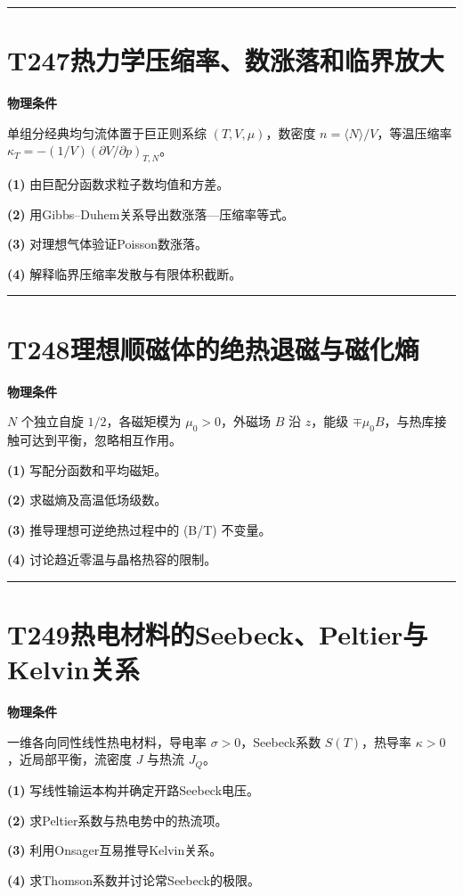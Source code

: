 \documentclass[UTF8,a4paper,11pt,oneside,openany]{ctexbook}
\begin{document}
\par\bigskip\hrule\bigskip
\section*{T247\quad 热力学压缩率、数涨落和临界放大}
\textbf{物理条件}\par 单组分经典均匀流体置于巨正则系综 \((T,V,\mu)\)，数密度 \(n=\langle N\rangle/V\)，等温压缩率 \(\kappa_T=-(1/V)(\partial V/\partial p)_{T,N}\)。
\par\noindent\textbf{(1)} 由巨配分函数求粒子数均值和方差。
\par\noindent\textbf{(2)} 用Gibbs–Duhem关系导出数涨落—压缩率等式。
\par\noindent\textbf{(3)} 对理想气体验证Poisson数涨落。
\par\noindent\textbf{(4)} 解释临界压缩率发散与有限体积截断。

\par\bigskip\hrule\bigskip
\section*{T248\quad 理想顺磁体的绝热退磁与磁化熵}
\textbf{物理条件}\par \(N\) 个独立自旋 \(1/2\)，各磁矩模为 \(\mu_0>0\)，外磁场 \(B\) 沿 \(z\)，能级 \(\mp\mu_0 B\)，与热库接触可达到平衡，忽略相互作用。
\par\noindent\textbf{(1)} 写配分函数和平均磁矩。
\par\noindent\textbf{(2)} 求磁熵及高温低场级数。
\par\noindent\textbf{(3)} 推导理想可逆绝热过程中的 (B/T) 不变量。
\par\noindent\textbf{(4)} 讨论趋近零温与晶格热容的限制。

\par\bigskip\hrule\bigskip
\section*{T249\quad 热电材料的Seebeck、Peltier与Kelvin关系}
\textbf{物理条件}\par 一维各向同性线性热电材料，导电率 \(\sigma>0\)，Seebeck系数 \(S(T)\)，热导率 \(\kappa>0\)，近局部平衡，流密度 \(J\) 与热流 \(J_Q\)。
\par\noindent\textbf{(1)} 写线性输运本构并确定开路Seebeck电压。
\par\noindent\textbf{(2)} 求Peltier系数与热电势中的热流项。
\par\noindent\textbf{(3)} 利用Onsager互易推导Kelvin关系。
\par\noindent\textbf{(4)} 求Thomson系数并讨论常Seebeck的极限。
\end{document}
